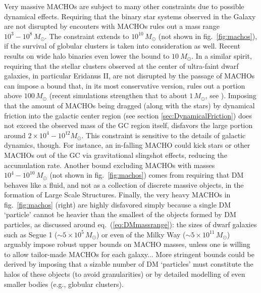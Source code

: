 Very massive MACHOs are subject to many other constraints due to possible dynamical effects. Requiring that the binary star systems observed in the Galaxy are not disrupted by encouters with MACHOs rules out a mass range $10^3 - 10^8\, M_\odot$. The constraint extends to $10^{10}\, M_\odot$ (not shown in fig.~\ref{fig:machos}), if the survival of globular clusters is taken into consideration as well. Recent results on wide halo binaries even lower the bound to $10 \ M_\odot$. In a similar spirit, requiring that the stellar clusters observed at the center of ultra-faint dwarf galaxies, in particular Eridanus II, are not disrupted by the passage of MACHOs can impose a bound that, in its most conservative version, rules out a portion above $100\, M_\odot$ 
(recent simulations strengthen that to about $1\, M_\odot$, see  \cite{MACHOconstraints}). 
Imposing that the amount of MACHOs being dragged (along with the stars) by dynamical friction into the galactic center region (see section \ref{sec:DynamicalFriction}) does not exceed the observed mass of the GC region itself, disfavors the large portion around $2 \times10^4 - 10^{12} M_\odot$. This constraint is sensitive to the details of galactic dynamics, though. For instance, an in-falling MACHO could kick stars or other MACHOs out of the GC via gravitational slingshot effects, reducing the accumulation rate. Another bound excluding MACHOs with masses $10^4 - 10^{10}\, M_\odot$ (not shown in fig.~\ref{fig:machos}) comes from requiring that DM behaves like a fluid, and not as a collection of discrete massive objects, in the formation of Large Scale Structures.
Finally, the very heavy MACHOs in fig.~\ref{fig:machos} (right) are highly disfavored simply because a single DM `particle' cannot be heavier than the smallest of the objects formed by DM particles, as discussed around eq.~(\ref{eq:DMmassrange}): the sizes of dwarf galaxies such as Segue 1 ($\sim 5\times 10^5\, M_\odot$) or even of the Milky Way ($\sim 5\times 10^{11}\, M_\odot$) arguably impose robust upper bounds on MACHO masses, unless one is willing to allow tailor-made MACHOs for each galaxy... More stringent bounds could be derived by imposing that a sizable number of DM `particles' must constitute the halos of these objects (to avoid granularities) or by detailed modelling of even smaller bodies (e.g., globular clusters).

\medskip


